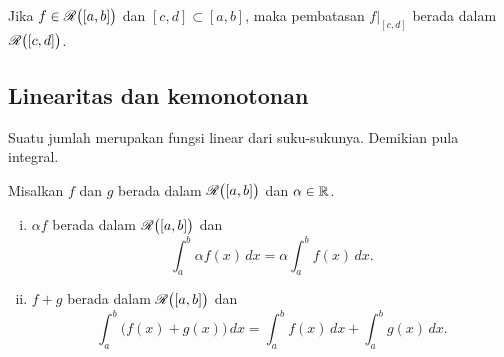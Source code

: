 \begin{cor} \label{intsubcor}
Jika $f \in {\mathscr{R}}\bigl([a,b]\bigr)$ dan
$[c,d] \subset [a,b]$, maka
pembatasan $f|_{[c,d]}$ berada dalam ${\mathscr{R}}\bigl([c,d]\bigr)$.
\end{cor}

\subsection{Linearitas dan kemonotonan}

Suatu jumlah merupakan fungsi linear dari suku-sukunya.  Demikian pula integral.

\begin{prop}[Linearitas]
\label{prop:integrallinear}
Misalkan $f$ dan $g$ berada dalam ${\mathscr{R}}\bigl([a,b]\bigr)$ dan $\alpha \in {\mathbb{R}}$.
\begin{enumerate}[(i)]
\item $\alpha f$ berada dalam ${\mathscr{R}}\bigl([a,b]\bigr)$ dan
\begin{equation*}
\int_a^b \alpha f(x) \,dx = \alpha \int_a^b f(x) \,dx .
\end{equation*}
\item $f+g$ berada dalam ${\mathscr{R}}\bigl([a,b]\bigr)$ dan
\begin{equation*}
\int_a^b \bigl( f(x)+g(x) \bigr) \,dx = 
\int_a^b f(x) \,dx 
+
\int_a^b g(x) \,dx .
\end{equation*}
\end{enumerate}
\end{prop}


